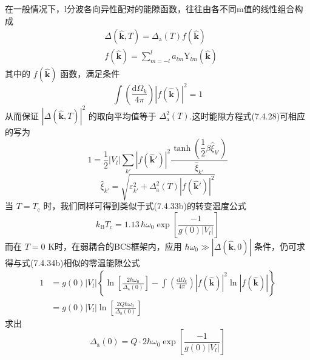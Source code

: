 在一般情况下，l分波各向异性配对的能隙函数，往往由各不同m值的线性组合构成
\begin{equation}
\begin{aligned}
  &\Delta\left(\hat{\boldsymbol{k}},T\right)=\Delta_{\mathrm{a}}(T)f(\hat{\boldsymbol{k}})\\
  &f(\hat{\boldsymbol{k}})=\sum_{m=-l}^{l}a_{lm}\mathrm{Y}_{lm}(\hat{\boldsymbol{k}})
\end{aligned}
\end{equation}
其中的 $f\left(\hat{\boldsymbol{k}}\right)$ 函数，满足条件
\begin{equation}
  \int\left(\frac{\mathrm{d}\Omega_{k}}{4\pi}\right)\left|f(\hat{\boldsymbol{k}})\right|^{2}=1
\end{equation}
从而保证 $\left|\Delta\left(\hat{\boldsymbol{k}},T\right)\right|^{2}$ 的取向平均值等于 $\Delta_{\mathrm{a}}^{2}(T)$.这时能隙方程式(7.4.28)可相应的写为
\begin{equation}
  1=\frac{1}{2}\left|V_{l}\right|\sum_{k'}\left|f(\hat{\boldsymbol{k}}')\right|^{2}
  \frac{\tanh\left(\dfrac{1}{2}\beta\hat{\xi}_{k'}\right)}{\hat{\xi}_{k'}}
\end{equation}
\begin{equation}
  \hat{\xi}_{k'}=\sqrt{\varepsilon_{k'}^{2}+\Delta_{\mathrm{a}}^{2}(T)\left|f(\hat{\boldsymbol{k}}')\right|^{2}}
\end{equation}
当 $T=T_{\mathrm{c}}$ 时，我们同样可得到类似于式(7.4.33b)的转变温度公式
\begin{equation}
  k_{\mathrm{B}}T_{\mathrm{c}}=1.13\,\hbar\omega_{0}\exp\left[\frac{-1}{g(0)\left|V_{l}\right|}\right]
\end{equation}
而在 $T=0$ K时，在弱耦合的BCS框架内，应用 $\hbar\omega_{0}\gg\left|\Delta(\hat{\boldsymbol{k}},0)\right|$ 条件，仍可求得与式(7.4.34b)相似的零温能隙公式
\begin{equation}
\begin{aligned}
  1&=g(0)\left|V_{l}\right|\left\{\ln\left[\frac{2\hbar\omega_{0}}{\Delta_{\mathrm{a}}(0)}\right]
  -\int\left(\frac{\mathrm{d}\Omega_{k}}{4\pi}\right)\left|f(\hat{\boldsymbol{k}})\right|^{2}\ln\left|f(\hat{\boldsymbol{k}})\right|\right\}\\
  &=g(0)\left|V_{l}\right|\ln\left[\frac{2Q\hbar\omega_{0}}{\Delta_{\mathrm{a}}(0)}\right]
\end{aligned}
\end{equation}
求出
\begin{equation}
  \Delta_{\mathrm{a}}(0)=Q\cdot2\hbar\omega_{0}\exp\left[\frac{-1}{g(0)\left|V_{l}\right|}\right]
\end{equation}

